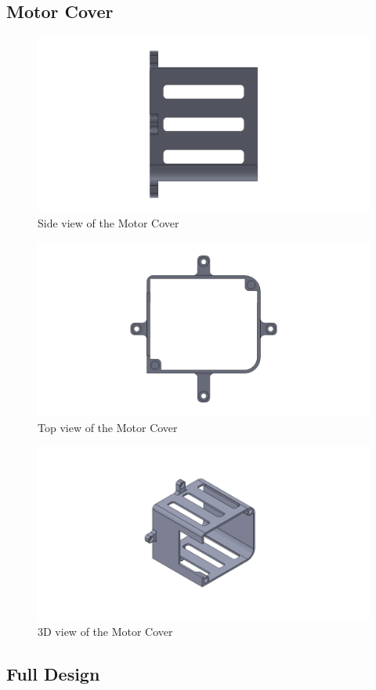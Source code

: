 \subsection{Motor Cover}
\begin{figure}[h]
	\centering
	\includegraphics[width=.5\linewidth]{motor_cover_1}
	\caption[Side view of the Motor Cover]{Side view of the Motor Cover}
	\label{fig:motorcover1}
\end{figure}
\begin{figure}[h]
	\centering
	\includegraphics[width=.5\linewidth]{motor_cover_2}
	\caption[Top view of the Motor Cover]{Top view of the Motor Cover}
	\label{fig:motorcover2}
\end{figure}
\begin{figure}[h]
	\centering
	\includegraphics[width=.5\linewidth]{motor_cover_3}
	\caption[3D view of the Motor Cover]{3D view of the Motor Cover}
	\label{fig:motorcover3}
\end{figure}


\newpage
\subsection{Full Design}


